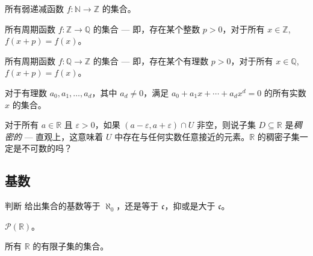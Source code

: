 \begin{chapex}
所有弱递减函数 $f : \mathbb{N} \to \mathbb{Z}$ 的集合。
\end{chapex}


\begin{chapex}
所有周期函数 $f : \mathbb{Z} \to \mathbb{Q}$ 的集合 --- 即，存在某个整数 $p > 0$，对于所有 $x \in \mathbb{Z}$, $f(x+p) = f(x)$。
\end{chapex}

\begin{chapex}
所有周期函数 $f : \mathbb{Q} \to \mathbb{Z}$ 的集合 --- 即，存在某个有理数 $p > 0$，对于所有 $x \in \mathbb{Q}$, $f(x+p) = f(x)$。
\end{chapex}

\begin{chapex}
\label{cqDetermineIfCountableEnd}
对于有理数 $a_0,a_1,\dots,a_d$，其中 $a_d \ne 0$，满足 $a_0 + a_1x + \cdots + a_dx^d = 0$ 的所有实数 $x$ 的集合。
\end{chapex}

\begin{chapex}
对于所有 $a \in \mathbb{R}$ 且 $\varepsilon > 0$，如果 $(a-\varepsilon, a+\varepsilon) \cap U$ 非空，则说子集 $D \subseteq \mathbb{R}$ 是\textit{稠密的} --- 直观上，这意味着 $U$ 中存在与任何实数任意接近的元素。$\mathbb{R}$ 的稠密子集一定是不可数的吗？
\end{chapex}

\subsection*{基数}

判断  给出集合的基数等于 $\aleph_0$，还是等于 $\mathfrak{c}$，抑或是大于 $\mathfrak{c}$。

\begin{chapex}
\label{cqFindCardinalityBegin}
$\mathcal{P}(\mathbb{R})$。
\end{chapex}

\begin{chapex}
所有 $\mathbb{R}$ 的有限子集的集合。
\end{chapex}

